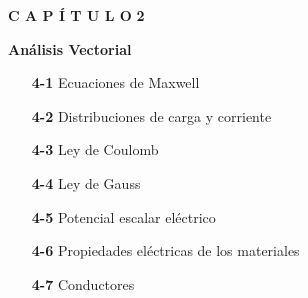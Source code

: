 
\thispagestyle{empty} %

\begin{minipage}[l]{0.35\textwidth}
    \hfill
\end{minipage}
\hfill
\begin{minipage}[c]{0.6\textwidth}
    \begin{flushleft}

        \vspace*{3cm} %

        \begin{center}
            \fontsize{30}{50}\selectfont
            \textbf{C A P Í T U L O}
            \hspace{0.2em}
            \fontsize{90}{100}\selectfont
            \textbf{2}
        \end{center}

        \vspace{1cm} %

        \begin{center}
            \fontsize{40}{60}\selectfont
            \color{LightGray}
            \textbf{Análisis Vectorial}
        \end{center}

        \vspace{2.5cm} %

        \begin{minipage}{0.6\textwidth} %
        \raggedright
        \linespread{1.5}\selectfont %
            \begin{itemize}
                \item[\textbf{4-1}] Ecuaciones de Maxwell
                \item[\textbf{4-2}] Distribuciones de carga y corriente
                \item[\textbf{4-3}] Ley de Coulomb
                \item[\textbf{4-4}] Ley de Gauss
                \item[\textbf{4-5}] Potencial escalar eléctrico
                \item[\textbf{4-6}] Propiedades eléctricas de los materiales
                \item[\textbf{4-7}] Conductores
            \end{itemize}
        \end{minipage}

        \vspace*{\fill} %
    \end{flushleft}
\end{minipage}

\newpage %

